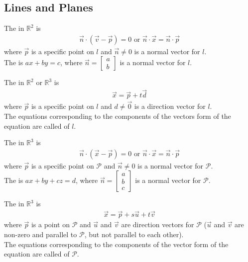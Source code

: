 \documentclass{article}
\begin{document}
\subsection{Lines and Planes}
\begin{definition}
    The  in $\mathbb{R}^2$ is
    \begin{gather*}
        \vec n \cdot (\vec v - \vec p) = 0 \text{  or  } \vec n \cdot \vec x = \vec n \cdot \vec p
    \end{gather*}
    where $\vec p$ is a specific point on $l$ and $\vec n \not= 0$ is a normal vector for $l$.\\
    The  is $ax+by=c$, where $\vec n = \begin{bmatrix}
        a\\b    
    \end{bmatrix}$ is a normal vector for $l$.
\end{definition}
\begin{definition}
    The  in $\mathbb{R}^2$ or $\mathbb{R}^3$ is
    \begin{gather*}
        \vec x = \vec p + t \vec d
    \end{gather*}
    where $\vec p$ is a specific point on $l$ and $d\not=\vec 0$ is a direction vector for $l$.\\
    The equations corresponding to the components of the vectors form of the equation are called  of $l$.
\end{definition}
\begin{definition}
    The  in $\mathbb{R}^3$ is
    \begin{gather*}
        \vec n \cdot (\vec x - \vec p) = 0 \text{  or  } \vec n \cdot \vec x = \vec n \cdot \vec p
    \end{gather*}
    where $\vec p$ is a specific point on $\mathcal{P}$ and $\vec n \not= 0$ is a normal vector for $\mathcal{P}$.\\
    The  is $ax + by + cz = d$, where $\vec n = \begin{bmatrix}
        a \\ b \\ c
    \end{bmatrix}$ is a normal vector for $\mathcal{P}$.
\end{definition}
\begin{definition}
    The  in $\mathbb{R}^3$ is
    \begin{gather*}
        \vec x = \vec p + s \vec u + t \vec v
    \end{gather*}
    where $\vec p$ is a point on $\mathcal{P}$ and $\vec u$ and $\vec v$ are direction vectors for $\mathcal{P}$ ($\vec u$ and $\vec v$ are non-zero and parallel to $\mathcal{P}$, but not parallel to each other).\\
    The equations corresponding to the components of the vector form of the equation are called  of $\mathcal{P}$.
\end{definition}
\end{document}
